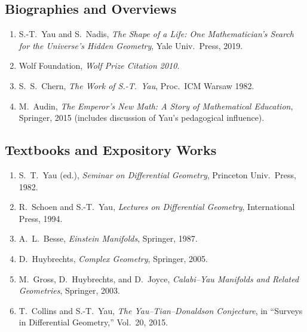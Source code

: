 \subsection*{Biographies and Overviews}
\begin{enumerate}
    \item S.-T.\ Yau and S.\ Nadis, \textit{The Shape of a Life: One Mathematician's Search for the Universe's Hidden Geometry}, Yale Univ.\ Press, 2019.
    \item Wolf Foundation, \textit{Wolf Prize Citation 2010}.
    \item S.\ S.\ Chern, \textit{The Work of S.-T.\ Yau}, Proc.\ ICM Warsaw 1982.
    \item M.\ Audin, \textit{The Emperor's New Math: A Story of Mathematical Education}, Springer, 2015 (includes discussion of Yau's pedagogical influence).
\end{enumerate}

\subsection*{Textbooks and Expository Works}
\begin{enumerate}
    \item S.\ T.\ Yau (ed.), \textit{Seminar on Differential Geometry}, Princeton Univ.\ Press, 1982.
    \item R.\ Schoen and S.-T.\ Yau, \textit{Lectures on Differential Geometry}, International Press, 1994.
    \item A.\ L.\ Besse, \textit{Einstein Manifolds}, Springer, 1987.
    \item D.\ Huybrechts, \textit{Complex Geometry}, Springer, 2005.
    \item M.\ Gross, D.\ Huybrechts, and D.\ Joyce, \textit{Calabi--Yau Manifolds and Related Geometries}, Springer, 2003.
    \item T.\ Collins and S.-T.\ Yau, \textit{The Yau--Tian--Donaldson Conjecture}, in ``Surveys in Differential Geometry,'' Vol.\ 20, 2015.
\end{enumerate}

